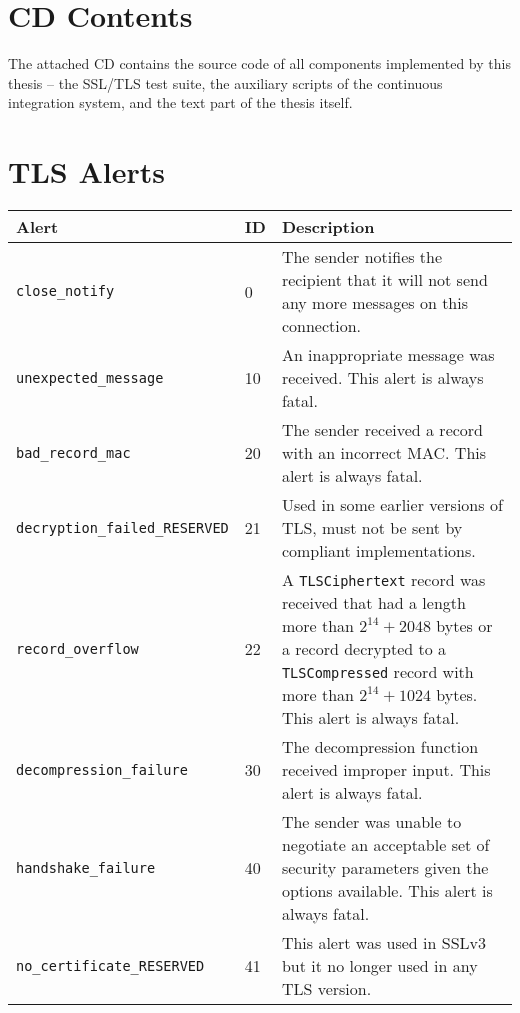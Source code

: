 \chapter{CD Contents}
    The attached CD contains the source code of all components implemented by
    this thesis -- the SSL/TLS test suite, the auxiliary scripts of the
    continuous integration system, and the text part of the thesis itself.

\chapter{TLS Alerts}
    \noindent\begin{tabularx}{\linewidth}{@{}l l X}
    \caption{TLS Alerts}\label{tab:tls-alerts} \\
    \toprule
    \textbf{Alert} & \textbf{ID} & \textbf{Description} \\
    \midrule
    \endhead
    \texttt{close\_notify}                & 0   & The sender notifies the recipient that it will not send any more messages
                                                  on this connection. \\
    \texttt{unexpected\_message}          & 10  & An inappropriate message was received. This alert is always fatal. \\
    \texttt{bad\_record\_mac}             & 20  & The sender received a record with an incorrect MAC. This alert is always fatal. \\
    \texttt{decryption\_failed\_RESERVED} & 21  & Used in some earlier versions of TLS, must not be sent by compliant implementations. \\
    \texttt{record\_overflow}             & 22  & A \texttt{TLSCiphertext} record was received that had a length more than $2^{14}+2048$ bytes or
                                                  a record decrypted to a \texttt{TLSCompressed} record with more than $2^{14}+1024$ bytes. This alert
                                                  is always fatal. \\
    \texttt{decompression\_failure}       & 30  & The decompression function received improper input. This alert is always fatal. \\
    \texttt{handshake\_failure}           & 40  & The sender was unable to negotiate an acceptable set of security parameters given
                                                  the options available. This alert is always fatal. \\
    \texttt{no\_certificate\_RESERVED}    & 41  & This alert was used in SSLv3 but it no longer used in any TLS version. \\

\end{tabularx}
